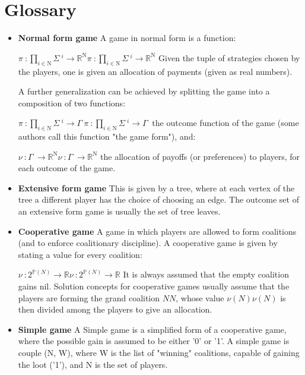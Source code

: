 \documentclass[]{report}
\begin{document}
\section{Glossary}

\begin{itemize}
\item \textbf{Normal form game}
A game in normal form is a function:

${\displaystyle \pi \ :\prod _{i\in \mathrm {N} }\Sigma \ ^{i}\to \mathbb {R} ^{\mathrm {N} }} \pi \ :\prod _{i\in \mathrm {N} }\Sigma \ ^{i}\to \mathbb {R} ^{\mathrm {N} }$
Given the tuple of strategies chosen by the players, one is given an allocation of payments (given as real numbers).

A further generalization can be achieved by splitting the game into a composition of two functions:

${\displaystyle \pi \ :\prod _{i\in \mathrm {N} }\Sigma \ ^{i}\to \Gamma \ } \pi \ :\prod _{i\in \mathrm {N} }\Sigma \ ^{i}\to \Gamma \ $
the outcome function of the game (some authors call this function "the game form"), and:

${\displaystyle \nu \ :\Gamma \ \to \mathbb {R} ^{\mathrm {N} }} \nu \ :\Gamma \ \to \mathbb {R} ^{\mathrm {N} }$
the allocation of payoffs (or preferences) to players, for each outcome of the game.

\item \textbf{Extensive form game}
This is given by a tree, where at each vertex of the tree a different player has the choice of choosing an edge. The outcome set of an extensive form game is usually the set of tree leaves.

\item \textbf{Cooperative game}
A game in which players are allowed to form coalitions (and to enforce coalitionary discipline). A cooperative game is given by stating a value for every coalition:

${\displaystyle \nu \ :2^{\mathbb {P} (N)}\to \mathbb {R} } \nu \ :2^{\mathbb {P} (N)}\to \mathbb {R} $
It is always assumed that the empty coalition gains nil. Solution concepts for cooperative games usually assume that the players are forming the grand coalition ${\displaystyle N} N$, whose value ${\displaystyle \nu (N)} \nu (N) $ is then divided among the players to give an allocation.

\item \textbf{Simple game}
A Simple game is a simplified form of a cooperative game, where the possible gain is assumed to be either '0' or '1'. A simple game is couple (N, W), where W is the list of "winning" coalitions, capable of gaining the loot ('1'), and N is the set of players.


\end{itemize}
\end{document}
